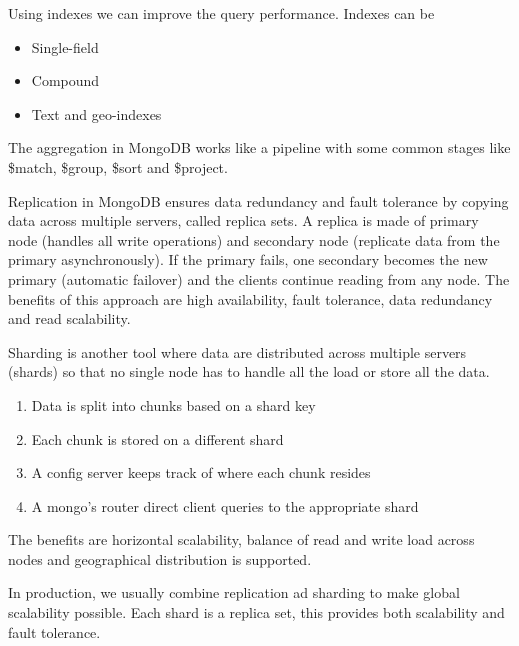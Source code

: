 Using indexes we can improve the query performance. Indexes can be
\begin{itemize}
    \item Single-field
    \item Compound
    \item Text and geo-indexes
\end{itemize}

The aggregation in MongoDB works like a pipeline with some common stages like \$match, \$group, \$sort and \$project.

\vspace{10pt}

Replication in MongoDB ensures data redundancy and fault tolerance by copying data across multiple servers, called replica sets. A replica is made of primary node (handles all write operations) and secondary node (replicate data from the primary asynchronously). If the primary fails, one secondary becomes the new primary (automatic failover) and the clients continue reading from any node. The benefits of this approach are high availability, fault tolerance, data redundancy and read scalability. 

\vspace{10pt}

Sharding is another tool where data are distributed across multiple servers (shards) so that no single node has to handle all the load or store all the data. 
\begin{enumerate}
    \item Data is split into chunks based on a shard key
    \item Each chunk is stored on a different shard
    \item A config server keeps track of where each chunk resides
    \item A mongo's router direct client queries to the appropriate shard
\end{enumerate}

The benefits are horizontal scalability, balance of read and write load across nodes and geographical distribution is supported.

\vspace{10pt}

In production, we usually combine replication ad sharding to make global scalability possible. Each shard is a replica set, this provides both scalability and fault tolerance. 

\vspace{10pt}

